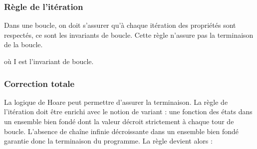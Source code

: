 \documentclass[9pt]{book}
\begin{document}
\subsubsection{R\`egle de l'it\'eration}
Dans une boucle, on doit s'assurer qu'\`a chaque it\'eration des propri\'et\'es sont respect\'es, ce sont les invariants de boucle.
Cette r\`egle n'assure pas la terminaison de la boucle.

o\`u I est l'invariant de boucle.

			\par
\subsubsection{Correction totale}
			La logique de Hoare peut permettre d'assurer la terminaison. La r\`egle de l'it\'eration doit \^etre enrichi avec le notion de variant : une fonction des \'etats dans un ensemble bien fond\'e dont la valeur d\'ecroit strictement \`a chaque tour de boucle. L'absence de cha\^ine infinie d\'ecroissante dans un ensemble bien fond\'e garantie donc la terminaison du programme. La r\`egle devient alors :



\end{document}
